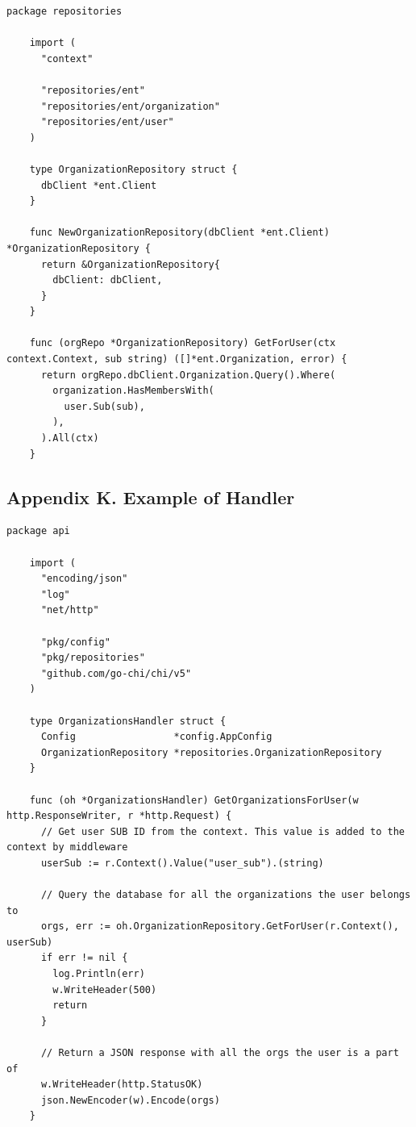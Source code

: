 \documentclass{article}
\begin{document}
  \begin{lstlisting}[language=Golang]
    package repositories

    import (
      "context"

      "repositories/ent"
      "repositories/ent/organization"
      "repositories/ent/user"
    )

    type OrganizationRepository struct {
      dbClient *ent.Client
    }

    func NewOrganizationRepository(dbClient *ent.Client) *OrganizationRepository {
      return &OrganizationRepository{
        dbClient: dbClient,
      }
    }

    func (orgRepo *OrganizationRepository) GetForUser(ctx context.Context, sub string) ([]*ent.Organization, error) {
      return orgRepo.dbClient.Organization.Query().Where(
        organization.HasMembersWith(
          user.Sub(sub),
        ),
      ).All(ctx)
    }
  \end{lstlisting}

  \subsection{Appendix K. Example of Handler}
  \label{sec:appendix-k}

  \begin{lstlisting}[language=Golang]
    package api

    import (
      "encoding/json"
      "log"
      "net/http"

      "pkg/config"
      "pkg/repositories"
      "github.com/go-chi/chi/v5"
    )

    type OrganizationsHandler struct {
      Config                 *config.AppConfig
      OrganizationRepository *repositories.OrganizationRepository
    }

    func (oh *OrganizationsHandler) GetOrganizationsForUser(w http.ResponseWriter, r *http.Request) {
      // Get user SUB ID from the context. This value is added to the context by middleware
      userSub := r.Context().Value("user_sub").(string)

      // Query the database for all the organizations the user belongs to
      orgs, err := oh.OrganizationRepository.GetForUser(r.Context(), userSub)
      if err != nil {
        log.Println(err)
        w.WriteHeader(500)
        return
      }

      // Return a JSON response with all the orgs the user is a part of
      w.WriteHeader(http.StatusOK)
      json.NewEncoder(w).Encode(orgs)
    }

  \end{lstlisting}
\end{document}
